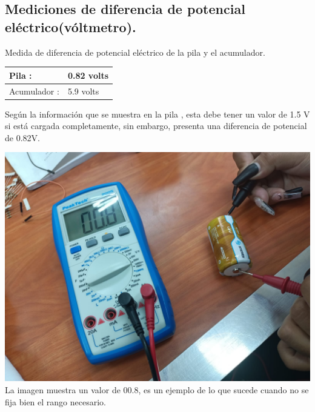 \documentclass[10pt]{article}
\begin{document}
\begin{multicols}{2}
\subsection{Mediciones de diferencia de potencial eléctrico(vóltmetro).}

Medida de diferencia de potencial eléctrico de la pila y el acumulador.

\begin{tabular}{ p{4cm} p{3cm} }
	\hline
	Pila : & 0.82 volts \\
	\hline
	Acumulador : & 5.9 volts \\
	\hline
\end{tabular}

Según la información que se muestra en la pila , esta debe tener un valor de 1.5 V si está cargada completamente, sin embargo, presenta una diferencia de potencial de 0.82V.

\begin{center}
	\includegraphics[scale = 0.1]{Imagenes/Fotos/Pila.jpeg}\\
	La imagen muestra un valor de 00.8, es un ejemplo de lo que sucede cuando no se fija bien el rango necesario.
\end{center}


\end{multicols}
\end{document}
